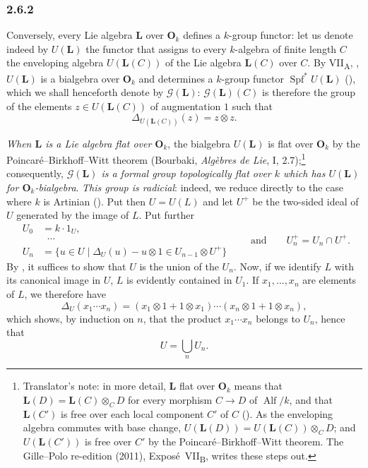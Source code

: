 
\subsubsection*{2.6.2}
\label{sga3:VIIB:2.6.2}

Conversely, every Lie algebra \(\mathbf L\) over \(\mathbf O_k\)
defines a \(k\)-group functor: let us denote indeed by \(U(\mathbf L)\)
the functor that assigns to every \(k\)-algebra of finite length \(C\)
the enveloping algebra \(U(\mathbf L(C))\) of the Lie algebra
\(\mathbf L(C)\) over \(C\). By VII\textsubscript{A}, ,
\(U(\mathbf L)\) is a bialgebra over \(\mathbf O_k\) and determines a
\(k\)-group functor \(\operatorname{Spf}^{*}U(\mathbf L)\)
\textup{()}, which we shall henceforth denote by
\(\mathscr G(\mathbf L)\): \(\mathscr G(\mathbf L)(C)\) is therefore the
group of the elements \(z\in U(\mathbf L(C))\) of augmentation \(1\) such
that
\[
  \Delta_{U(\mathbf L(C))}(z)=z\otimes z.
\]

\label{sga3:VIIB:2.6.2:prop}%
\emph{When \(\mathbf L\) is a Lie algebra flat over \(\mathbf O_k\)}, the
bialgebra \(U(\mathbf L)\) is flat over \(\mathbf O_k\) by the
Poincaré--Birkhoff--Witt theorem \textup{(}Bourbaki, \emph{Alg\`ebres de
Lie}, I, 2.7\textup{)};\footnote{Translator's note: in more detail, \(\mathbf L\) flat over \(\mathbf O_k\)
means that \(\mathbf L(D)=\mathbf L(C)\otimes_CD\) for every morphism \(C\to D\) of \(\operatorname{Alf}/k\),
and that \(\mathbf L(C')\) is free over each local component \(C'\) of \(C\) (). As
the enveloping algebra commutes with base change, \(U(\mathbf L(D))=U(\mathbf L(C))\otimes_CD\); and
\(U(\mathbf L(C'))\) is free over \(C'\) by the Poincaré--Birkhoff--Witt theorem. The Gille--Polo
re-edition (2011), Expos\'e~VII\textsubscript{B}, writes these steps out.} consequently, \emph{\(\mathscr G(\mathbf L)\) is a
formal group topologically flat over \(k\) which has \(U(\mathbf L)\) for
\(\mathbf O_k\)-bialgebra}. \emph{This group is radicial}: indeed, we
reduce directly to the case where \(k\) is Artinian
\textup{()}. Put then \(U=U(L)\) and let \(U^+\) be the
two-sided ideal of \(U\) generated by the image of \(L\). Put further
\[
\begin{aligned}
  U_0&=k\cdot1_U,\\
  &\;\;\cdots\\
  U_n&=\{u\in U\mid\Delta_U(u)-u\otimes1\in U_{n-1}\otimes U^+\}
\end{aligned}
\qquad\text{and}\qquad
U_n^+=U_n\cap U^+.
\]
By , it suffices to show that \(U\) is the union of the
\(U_n\). Now, if we identify \(L\) with its canonical image in \(U\),
\(L\) is evidently contained in \(U_1\). If \(x_1,\ldots,x_n\) are
elements of \(L\), we therefore have
\[
  \Delta_U(x_1\cdots x_n)
  =
  (x_1\otimes1+1\otimes x_1)\cdots
  (x_n\otimes1+1\otimes x_n),
\]
which shows, by induction on \(n\), that the product \(x_1\cdots x_n\)
belongs to \(U_n\), hence that
\[
  U=\bigcup_n U_n.
\]

